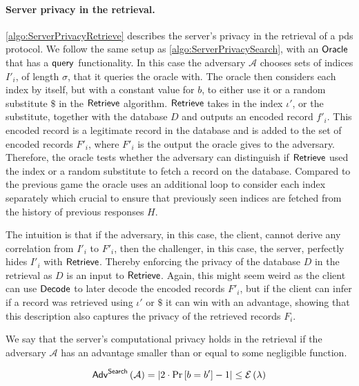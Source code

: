 \paragraph*{Server privacy in the retrieval.}
\cref{algo:ServerPrivacyRetrieve} describes the server's privacy in the retrieval of a \acrshort{pds} protocol. We follow the same setup as \cref{algo:ServerPrivacySearch}, with an $ \mathsf{{Oracle}} $ that has a $ \mathsf{{query}} $ functionality. In this case the adversary $ \mathcal{A} $ chooses sets of indices $ I'_i $, of length $ \sigma $, that it queries the oracle with. The oracle then considers each index by itself, but with a constant value for $ b $, to either use it or a random substitute $ \$ $ in the $ \mathsf{{Retrieve}} $ algorithm. $ \mathsf{{Retrieve}} $ takes in the index $ \iota' $, or the substitute, together with the database $ D $ and outputs an encoded record $ f'_i $. This encoded record is a legitimate record in the database and is added to the set of encoded records $ F'_i $, where $ F'_i $ is the output the oracle gives to the adversary. Therefore, the oracle tests whether the adversary can distinguish if $ \mathsf{{Retrieve}} $ used the index or a random substitute to fetch a record on the database. Compared to the previous game the oracle uses an additional loop to consider each index separately which crucial to ensure that previously seen indices are fetched from the history of previous responses $ H $.

The intuition is that if the adversary, in this case, the client, cannot derive any correlation from $ I'_i $ to $ F'_i $, then the challenger, in this case, the server, perfectly hides $ I'_i $ with $ \mathsf{{Retrieve}} $. Thereby enforcing the privacy of the database $ D $ in the retrieval as $ D $ is an input to $ \mathsf{{Retrieve}} $. Again, this might seem weird as the client can use $ \mathsf{{Decode}} $ to later decode the encoded records $ F'_i $, but if the client can infer if a record was retrieved using $ \iota' $ or $ \$ $ it can win with an advantage, showing that this description also captures the privacy of the retrieved records $ F_i $.

We say that the server's computational privacy holds in the retrieval if the adversary $ \mathcal{A} $ has an advantage smaller than or equal to some negligible function.

\begin{equation*}
    \mathsf{{Adv}}^{\mathsf{{Search}}} \left( \mathcal{A} \right) = \left| 2 \cdot \Pr \left[ b = b' \right] - 1 \right| \leq \mathcal{E} \left( \lambda \right)
\end{equation*}

